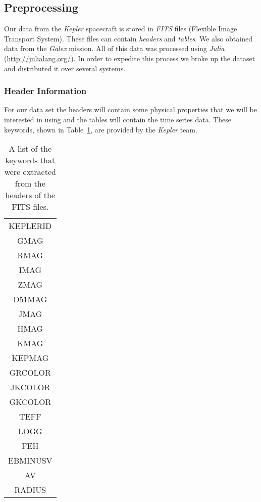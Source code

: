 \subsection{Preprocessing}
\label{sub:Preprocessing}
Our data from the \textit{Kepler} spacecraft is stored in \textit{FITS} files (Flexible Image Transport System).
These files can contain \emph{headers} and \emph{tables}.
We also obtained data from the \textit{Galex} mission.
All of this data was processed using \emph{Julia} (\url{http://julialang.org/}).
In order to expedite this process we broke up the dataset and distributed it over several systems.

\subsubsection{Header Information}
\label{ssub:Header Information}
For our data set the headers will contain some physical properties that we will be interested in using and the tables will contain the time series data.
These keywords, shown in Table~\ref{tab:keywords}, are provided by the \textit{Kepler} team.
\begin{table}
    \begin{center}
    \begin{tabular}{|c|}
        \hline
        KEPLERID\\
        GMAG\\
        RMAG\\
        IMAG\\
        ZMAG\\
        D51MAG\\
        JMAG\\
        HMAG\\
        KMAG\\
        KEPMAG\\
        GRCOLOR\\
        JKCOLOR\\
        GKCOLOR\\
        TEFF\\
        LOGG\\
        FEH\\
        EBMINUSV\\
        AV\\
        RADIUS\\
        \hline
    \end{tabular}
    \end{center}
    \caption{A list of the keywords that were extracted from the headers of the FITS files.}
    \label{tab:keywords}
\end{table}

